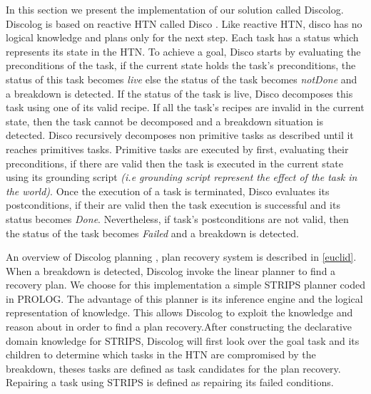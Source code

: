 \documentclass[conference]{IEEEtran}
\begin{document}
	\par In this section we present the implementation of our solution called Discolog. Discolog is based on reactive HTN called Disco \cite{rich2009building}. Like reactive HTN, disco has no logical knowledge and plans only for the next step. Each task has a status which represents its state in the HTN. To achieve a goal, Disco starts by evaluating the preconditions of the task, if the current state holds the task's preconditions, the status of this task becomes \textit{live} else the status of the task becomes \textit{notDone} and a breakdown is detected. If the status of the task is live, Disco decomposes this task using one of its valid recipe. If all the task's recipes are invalid in the current state, then the task cannot be decomposed and a breakdown situation is detected. Disco recursively decomposes non primitive tasks as described until it reaches primitives tasks. Primitive tasks are executed by first, evaluating their preconditions, if there are valid then the task is executed in the current state using its grounding script \textit{(i.e grounding script represent the effect of the task in the world)}. Once the execution of a task is terminated, Disco evaluates its postconditions, if their are valid then the task execution is successful and its status becomes \textit{Done}. Nevertheless, if task's postconditions  are not valid, then the status of the task becomes \textit{Failed} and a breakdown is detected. 
	
	\par  An overview of Discolog planning , plan recovery system is described in \ref{euclid}. When a breakdown is detected, Discolog invoke the linear planner to find a recovery plan. We choose for this implementation a simple STRIPS planner coded in PROLOG. The advantage of this planner is its inference engine and the logical representation of knowledge. This allows Discolog to exploit the knowledge and  reason about in order to find a plan recovery.After constructing the declarative domain knowledge for STRIPS, Discolog  will  first look over the goal task and its children to determine which tasks in the HTN  are compromised by the breakdown, theses tasks are defined as task candidates for the plan recovery. Repairing a task using STRIPS is defined as repairing its failed conditions. 
	
\end{document}
